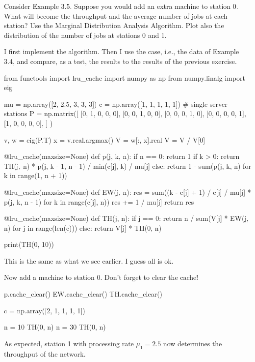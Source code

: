 \begin{exercise}
  Consider Example 3.5. Suppose you would add an extra machine to
  station 0. What will become the throughput and the average number of
  jobs at each station? Use the Marginal Distribution Analysis
  Algorithm. Plot also the distribution of the number of jobs at
  stations 0 and 1.
  \begin{solution}
    I first implement the algorithm. Then I use the case, i.e., the
    data of Example 3.4, and compare, as a test, the results to the
    results of the previous exercise.

\begin{pyconsole}
from functools import lru_cache
import numpy as np
from numpy.linalg import eig

mu = np.array([2, 2.5, 3, 3, 3])
c = np.array([1, 1, 1, 1, 1])  # single server stations
P = np.matrix([
    [0, 1, 0, 0, 0],
    [0, 0, 1, 0, 0],
    [0, 0, 0, 1, 0],
    [0, 0, 0, 0, 1],
    [1, 0, 0, 0, 0],
]
)

v, w = eig(P.T)
x = v.real.argmax()
V = w[:, x].real
V = V / V[0]


@lru_cache(maxsize=None)
def p(j, k, n):
    if n == 0:
        return 1
    if k > 0:
        return TH(j, n) * p(j, k - 1, n - 1) / min(c[j], k) / mu[j]
    else:
        return 1 - sum(p(j, k, n) for k in range(1, n + 1))


@lru_cache(maxsize=None)
def EW(j, n):
    res = sum((k - c[j] + 1) / c[j] / mu[j] * p(j, k, n - 1)
              for k in range(c[j], n))
    res += 1 / mu[j]
    return res


@lru_cache(maxsize=None)
def TH(j, n):
    if j == 0:
        return n / sum(V[j] * EW(j, n) for j in range(len(c)))
    else:
        return V[j] * TH(0, n)

print(TH(0, 10))
  
\end{pyconsole}

This is the same as what we see earlier. I guess all is ok. 

Now add a machine to station 0. Don't forget to clear the cache!

\begin{pyconsole}
p.cache_clear()
EW.cache_clear()
TH.cache_clear()

c = np.array([2, 1, 1, 1, 1])

n = 10
TH(0, n)
n = 30
TH(0, n)
  
\end{pyconsole}

As expected, station 1 with processing rate $\mu_1=2.5$ now determines
the throughput of the network.



\end{solution}
\end{exercise}
